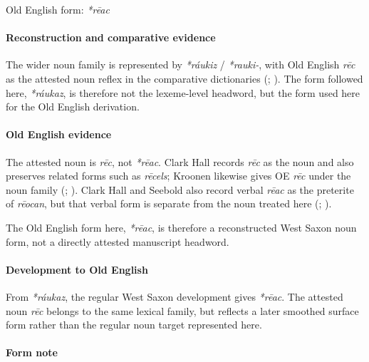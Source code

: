 \documentclass[
  british,
  a4paper,
]{article}
\begin{document}
Old English form: \emph{*rēac}

\paragraph{Reconstruction and comparative
evidence}\label{reconstruction-and-comparative-evidence-68}

The wider noun family is represented by \emph{*ráukiz} / \emph{*rauki-},
with Old English \emph{rēc} as the attested noun reflex in the
comparative dictionaries (;
). The form followed here,
\emph{*ráukaz}, is therefore not the lexeme-level headword, but the form
used here for the Old English derivation.

\paragraph{Old English evidence}\label{old-english-evidence-68}

The attested noun is \emph{rēc}, not \emph{*rēac}. Clark Hall records
\emph{rēc} as the noun and also preserves related forms such as
\emph{rēcels}; Kroonen likewise gives OE \emph{rēc} under the noun
family (;
). Clark Hall and Seebold
also record verbal \emph{rēac} as the preterite of \emph{rēocan}, but
that verbal form is separate from the noun treated here
(;
).

The Old English form here, \emph{*rēac}, is therefore a reconstructed
West Saxon noun form, not a directly attested manuscript headword.

\paragraph{Development to Old
English}\label{development-to-old-english-68}

From \emph{*ráukaz}, the regular West Saxon development gives
\emph{*rēac}. The attested noun \emph{rēc} belongs to the same lexical
family, but reflects a later smoothed surface form rather than the
regular noun target represented here.

\paragraph{Form note}\label{form-note}
\end{document}
